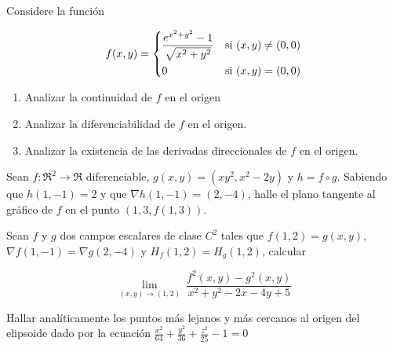 
\begin{question}
    Considere la función
    
     \[
        f(x,y) =
        \begin{dcases}
            \frac{e^{x^{2}+y^{2}}-1}{\sqrt{x^{2}+y^{2}}} & \textnormal{si}\ (x,y) \neq (0,0) \\
            0                         & \textnormal{si}\ (x,y) = (0,0)
        \end{dcases}
    \]

    \begin{enumerate}
        \item Analizar la continuidad de $f$ en el origen
        \item Analizar la diferenciabilidad de $f$ en el origen.
        \item Analizar la existencia de las derivadas direccionales de $f$ en el origen.\\
    \end{enumerate}
\end{question}

\begin{question}
    Sean $f:\Re^{2}\to\Re$ diferenciable, $g(x,y)=(xy^2,x^2-2y)$ y $h=f\circ g$. Sabiendo que $h(1,-1) = 2$ y que $\nabla h(1,-1)=(2,-4)$, halle el plano tangente al gráfico de $f$ en el punto $(1,3,f(1,3))$.
\end{question}
\begin{question}
    Sean $f$ y $g$ dos campos escalares de clase $C^2$ tales que $f(1,2)=g(x,y)$, $\nabla f(1,-1)=\nabla g(2,-4)$ y $H_f(1,2)=H_g(1,2)$, calcular 
    
\[
        \lim_{(x,y)\to(1,2)} \
        \frac{f^2(x,y)-g^2(x,y)}{x^2+y^2-2x-4y+5}
    \]
\end{question}
\begin{question}
    Hallar analíticamente los puntos más lejanos y más cercanos al origen del elipsoide dado por la ecuación {\large$\frac{x^2}{64}+\frac{y^2}{36}+\frac{z^2}{25}-1=0$}
\end{question}
\newpage

